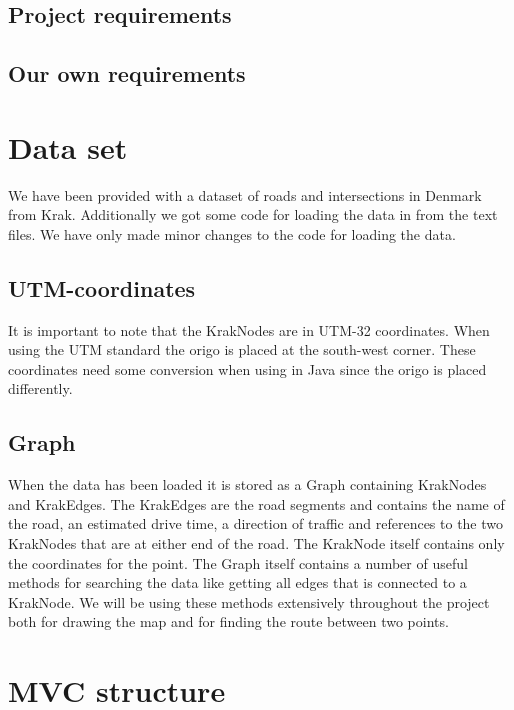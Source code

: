 \subsection{Project requirements}
\label{BG-R-PR}
\subsection{Our own requirements}
\label{BG-R-OOR}

\section{Data set}
\label{BG-DS}
We have been provided with a dataset of roads and intersections in Denmark 
from Krak. Additionally we got some code for loading the data in from the 
text files. We have only made minor changes to the code for loading the data.
\subsection{UTM-coordinates}
\label{BG-DS-UTM}
It is important to note that the KrakNodes are in UTM-32 coordinates. When 
using the UTM standard the origo is placed at the south-west corner. These 
coordinates need some conversion when using in Java since the origo is placed 
differently.
\subsection{Graph}
\label{BG-DS-G}
When the data has been loaded it is stored as a Graph containing KrakNodes 
and KrakEdges. The KrakEdges are the road segments and contains the name 
of the road, an estimated drive time, a direction of traffic and references 
to the two KrakNodes that are at either end of the road.  The KrakNode itself 
contains only the coordinates for the point.
The Graph itself contains a number of useful methods for searching the data 
like getting all edges that is connected to a KrakNode. We will be using these 
methods extensively throughout the project both for drawing the map and for 
finding the route between two points.
\section{MVC structure}
\label{BG-MVC}
